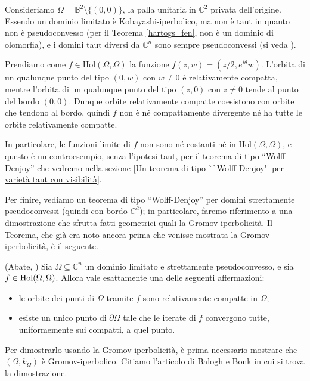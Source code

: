 \begin{ex} \label{servetaut}
    Consideriamo $\Omega=\mathbb{B}^2\setminus\{(0,0)\}$, la palla unitaria in $\mathbb{C}^2$ privata dell'origine. Essendo un dominio limitato è Kobayashi-iperbolico, ma non è taut in quanto non è pseudoconvesso (per il Teorema \ref{hartogs_fen}, non è un dominio di olomorfia), e i domini taut diversi da $\mathbb{C}^n$ sono sempre pseudoconvessi (si veda \cite[Theorem F]{W}).

    Prendiamo come $f\in\text{Hol}(\Omega,\Omega)$ la funzione $f(z,w)=(z/2,e^{i\theta}w)$. L'orbita di un qualunque punto del tipo $(0,w)$ con $w\not=0$ è relativamente compatta, mentre l'orbita di un qualunque punto del tipo $(z,0)$ con $z\not=0$ tende al punto del bordo $(0,0)$. Dunque orbite relativamente compatte coesistono con orbite che tendono al bordo, quindi $f$ non è né compattamente divergente né ha tutte le orbite relativamente compatte.
    
    In particolare, le funzioni limite di $f$ non sono né costanti né in $\text{Hol}(\Omega,\Omega)$, e questo è un controesempio, senza l'ipotesi taut, per il teorema di tipo ``Wolff-Denjoy'' che vedremo nella sezione \ref{Un teorema di tipo ``Wolff-Denjoy'' per varietà taut con visibilità}.
\end{ex}

Per finire, vediamo un teorema di tipo ``Wolff-Denjoy'' per domini strettamente pseudoconvessi (quindi con bordo $C^2$); in particolare, faremo riferimento a una dimostrazione che sfrutta fatti geometrici quali la Gromov-iperbolicità. Il Teorema, che già era noto ancora prima che venisse mostrata la Gromov-iperbolicità, è il seguente.

\begin{thm} \label{abate_wd}
    (Abate, \cite[Theorem 0.5]{A2}) Sia $\Omega \subseteq \mathbb{C}^n$ un dominio limitato e strettamente pseudoconvesso, e sia $f \in \textnormal{Hol}(\Omega,\Omega)$. Allora vale esattamente una delle seguenti affermazioni:
    \begin{itemize}
        \item le orbite dei punti di $\Omega$ tramite $f$ sono relativamente compatte in $\Omega$;
        \item esiste un unico punto di $\partial\Omega$ tale che le iterate di $f$ convergono tutte, uniformemente sui compatti, a quel punto.
    \end{itemize}
\end{thm}

Per dimostrarlo usando la Gromov-iperbolicità, è prima necessario mostrare che $(\Omega,k_{\Omega})$ è Gromov-iperbolico. Citiamo l'articolo di Balogh e Bonk in cui si trova la dimostrazione.

